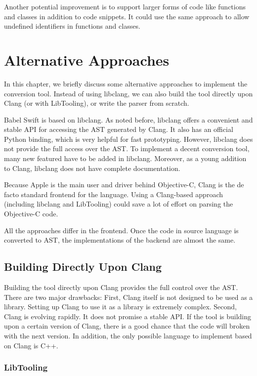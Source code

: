 \documentclass{sfuthesis}
\begin{document}
Another potential improvement is to support larger forms of code like functions and classes in addition to code snippets. It could use the same approach to allow undefined identifiers in functions and classes.

\chapter{Alternative Approaches}

In this chapter, we briefly discuss some alternative approaches to implement the conversion tool. Instead of using libclang, we can also build the tool directly upon Clang (or with LibTooling), or write the parser from scratch.

Babel Swift is based on libclang. As noted before, libclang offers a convenient and stable API for accessing the AST generated by Clang. It also has an official Python binding, which is very helpful for fast prototyping. However, libclang does not provide the full access over the AST. To implement a decent conversion tool, many new featured have to be added in libclang. Moreover, as a young addition to Clang, libclang does not have complete documentation.

Because Apple is the main user and driver behind Objective-C, Clang is the de facto standard frontend for the language. Using a Clang-based approach (including libclang and LibTooling) could save a lot of effort on parsing the Objective-C code.

All the approaches differ in the frontend. Once the code in source language is converted to AST, the implementations of the backend are almost the same.

\section{Building Directly Upon Clang}

Building the tool directly upon Clang provides the full control over the AST. There are two major drawbacks: First, Clang itself is not designed to be used as a library. Setting up Clang to use it as a library is extremely complex. Second, Clang is evolving rapidly. It does not promise a stable API. If the tool is building upon a certain version of Clang, there is a good chance that the code will broken with the next version. In addition, the only possible language to implement based on Clang is C++.

\subsection{LibTooling}
\end{document}
